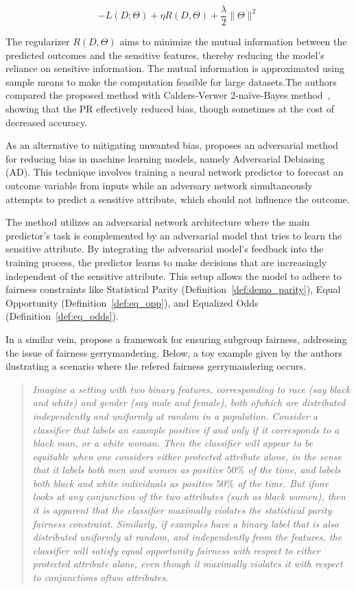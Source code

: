 \begin{equation} \label{eq:prejudice_remover}
    -L(D;\Theta) + \eta R(D, \Theta) + \frac{\lambda}{2} \|\Theta\|^2
\end{equation}

The regularizer \( R(D, \Theta) \) aims to minimize the mutual information between the predicted outcomes and the sensitive features, thereby reducing the model's reliance on sensitive information. The mutual information is approximated using sample means to make the computation feasible for large datasets.The authors compared the proposed method with Calders-Verwer 2-naïve-Bayes method~\citep{Calders2010}, showing that the PR effectively reduced bias, though sometimes at the cost of decreased accuracy. 

As an alternative to mitigating unwanted bias, \cite{Zhang2018} proposes an adversarial method for reducing bias in machine learning models, namely Adversarial Debiasing (AD). This technique involves training a neural network predictor to forecast an outcome variable from inputs while an adversary network simultaneously attempts to predict a sensitive attribute, which should not influence the outcome. 

The method utilizes an adversarial network architecture where the main predictor's task is complemented by an adversarial model that tries to learn the sensitive attribute. By integrating the adversarial model’s feedback into the training process, the predictor learns to make decisions that are increasingly independent of the sensitive attribute. This setup allows the model to adhere to fairness constraints like Statistical Parity (Definition~\ref{def:demo_parity}), Equal Opportunity (Definition~\ref{def:eq_opp}), and Equalized Odds (Definition~\ref{def:eq_odds}).

In a similar vein, \cite{kearns18a} propose a framework for ensuring subgroup fairness, addressing the issue of fairness gerrymandering. Below, a toy example given by the authors ilustrating a scenario where the refered fairness gerrymandering occurs.

\begin{quote}\textit{
Imagine a setting with two binary features, corresponding to race (say black and white) and gender (say male and female), both ofwhich are distributed independently and uniformly at random in a population. Consider a classiﬁer that labels an example positive if and only if it corresponds to a black man, or a white woman. Then the classiﬁer will appear to be equitable when one considers either protected attribute alone, in the sense that it labels both men and women as positive $50\%$ of the time, and labels both black and white individuals as positive $50\%$ of the time. But ifone looks at any conjunction of the two attributes (such as black women), then it is apparent that the classiﬁer maximally violates the statistical parity fairness constraint. Similarly, if examples have a binary label that is also distributed uniformly at random, and independently from the features, the classiﬁer will satisfy equal opportunity fairness with respect to either protected attribute alone, even though it maximally violates it with respect to conjunctions oftwo attributes.}
\end{quote}


